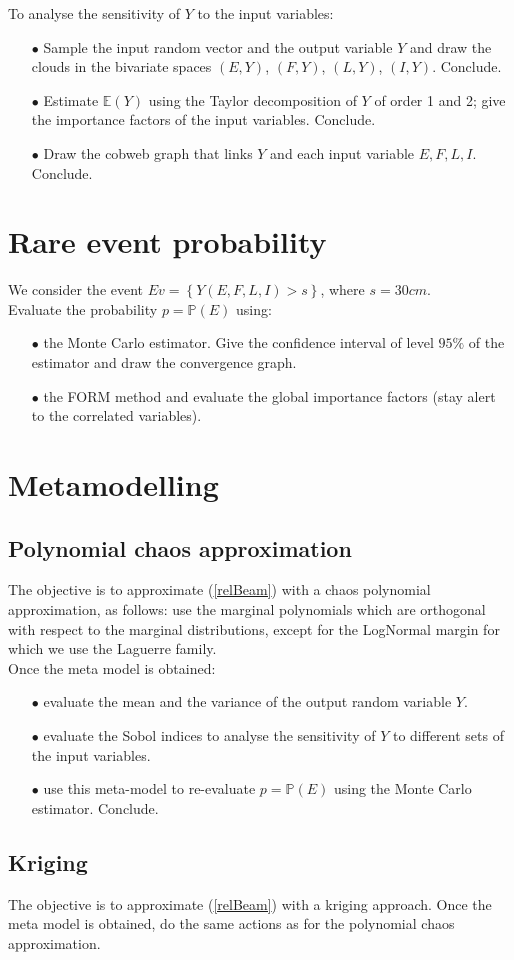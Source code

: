 \documentclass[11pt, french, A4wide]{article}
\theoremstyle{remark}
\theoremstyle{definition}
\begin{document}
To analyse the sensitivity of $Y$ to the input variables:
 \begin{itemize}
 \item[$\bullet$] Sample the input random vector and the output variable $Y$ and draw the clouds in the bivariate spaces  $(E,Y)$, $(F,Y)$, $(L,Y)$, $(I,Y)$.  Conclude.
 \item[$\bullet$] Estimate $\mathbb{E}(Y)$ using the Taylor decomposition of $Y$ of order 1 and 2; give the importance factors of the input variables.  Conclude.
 \item[$\bullet$] Draw the cobweb graph that links $Y$ and each input variable $E, F, L, I$. Conclude.
 \end{itemize}

\newpage
\section{Rare event probability}

We consider the event $Ev = \left\{Y(E,F,L,I) > s \right\}$, where $s = 30cm$.\\

Evaluate the probability $p=\mathbb{P}(E)$ using:
 \begin{itemize}
 \item[$\bullet$] the Monte Carlo estimator. Give the  confidence interval of level $95 \%$ of the estimator and draw the convergence graph.
 \item[$\bullet$] the FORM method and evaluate the global importance factors (stay alert to the correlated variables).
 \end{itemize}


\section{Metamodelling}

\subsection{Polynomial chaos approximation}

The objective is to approximate (\ref{relBeam}) with a chaos polynomial approximation, as follows: use the marginal polynomials which are orthogonal with respect to the marginal distributions, except for the LogNormal margin for which we use the Laguerre family.\\

Once the meta model is obtained:
\begin{itemize}
 \item[$\bullet$] evaluate the mean and the variance of the output random variable $Y$.
 \item[$\bullet$] evaluate the Sobol indices to analyse the sensitivity of $Y$ to different sets of the input variables.
 \item[$\bullet$] use this meta-model to re-evaluate $p=\mathbb{P}(E)$ using the Monte Carlo estimator. Conclude.
 \end{itemize}



\subsection{Kriging}

The objective is to approximate (\ref{relBeam}) with a kriging approach. Once the meta model is obtained, do the same actions as for the polynomial chaos approximation.
\end{document}
